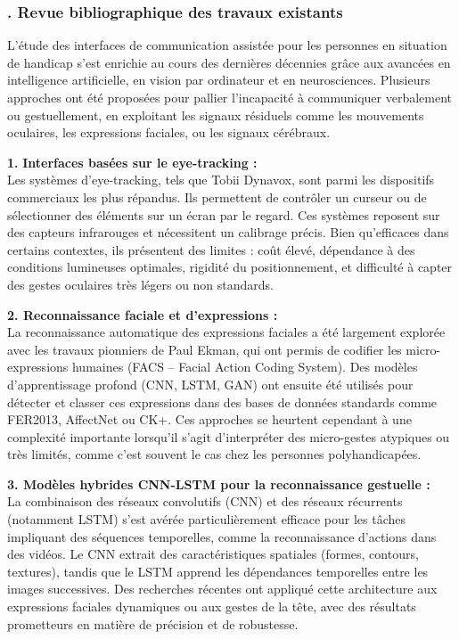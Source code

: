 \documentclass[
]{article}
\begin{document}
\hypertarget{revue-bibliographique-des-travaux-existants}{%
\subsubsection{\texorpdfstring{\hfill{}. Revue bibliographique des travaux existants}{ 10.1. Revue bibliographique des travaux existants}}\label{revue-bibliographique-des-travaux-existants}}

L'étude des interfaces de communication assistée pour les personnes en situation de handicap s'est enrichie au cours des dernières décennies grâce aux avancées en intelligence artificielle, en vision par ordinateur et en neurosciences. Plusieurs approches ont été proposées pour pallier l'incapacité à communiquer verbalement ou gestuellement, en exploitant les signaux résiduels comme les mouvements oculaires, les expressions faciales, ou les signaux cérébraux.

\textbf{1.} \textbf{Interfaces basées sur le eye-tracking :\\
} Les systèmes d'eye-tracking, tels que Tobii Dynavox, sont parmi les dispositifs commerciaux les plus répandus. Ils permettent de contrôler un curseur ou de sélectionner des éléments sur un écran par le regard. Ces systèmes reposent sur des capteurs infrarouges et nécessitent un calibrage précis. Bien qu'efficaces dans certains contextes, ils présentent des limites : coût élevé, dépendance à des conditions lumineuses optimales, rigidité du positionnement, et difficulté à capter des gestes oculaires très légers ou non standards.{}

\textbf{2. Reconnaissance faciale et d'expressions :\\
} La reconnaissance automatique des expressions faciales a été largement explorée avec les travaux pionniers de Paul Ekman{}, qui ont permis de codifier les micro-expressions humaines (FACS -- Facial Action Coding System). Des modèles d'apprentissage profond (CNN, LSTM, GAN) ont ensuite été utilisés pour d{}étecter et classer ces expressions dans des bases de données standards comme FER2013, AffectNet ou CK+. Ces approches se heurtent cependant à une complexité importante lorsqu'il s'agit d'interpréter des micro-gestes atypiques ou très limités, comme c'est souvent le cas chez les personnes polyhandicapées.

\textbf{3. Modèles hybrides CNN-LSTM pour la reconnaissance gestuelle :\\
} La combinaison des réseaux convolutifs (CNN) et des réseaux récurrents (notamment LSTM) s'est avérée particulièrement efficace pour les tâches impliquant des séquences temporelles, comme la reconnaissance d'actions dans des vidéos. Le CNN extrait des caractéristiques spatiales (formes, contours, textures), tandis que le LSTM apprend les dépendances temporelles entre les images successives. Des recherches récentes ont appliqué cette architecture aux expressions faciales dynamiques ou aux gestes de la tête, avec des résultats prometteurs en matière de précision et de robustesse.
\end{document}
